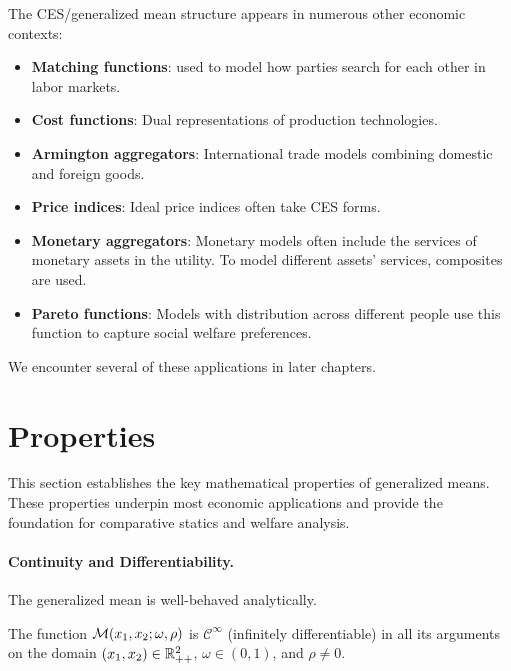 The CES/generalized mean structure appears in numerous other economic contexts:
\begin{itemize}[leftmargin=0em]
    \item \textbf{Matching functions}: used to model how parties search for each other in labor markets.
    \item \textbf{Cost functions}: Dual representations of production technologies.
    \item \textbf{Armington aggregators}: International trade models combining domestic and foreign goods.
    \item \textbf{Price indices}: Ideal price indices often take CES forms.
    \item \textbf{Monetary aggregators}: Monetary models often include the services of monetary assets in the utility. To model different assets' services, composites are used.
    \item \textbf{Pareto functions}: Models with distribution across different people use this function to capture social welfare preferences.
\end{itemize}
We encounter several of these applications in later chapters.


\section{Properties}
\label{sec:properties}

This section establishes the key mathematical properties of generalized means. These properties underpin most economic applications and provide the foundation for comparative statics and welfare analysis.

\paragraph{Continuity and Differentiability.}

The generalized mean is well-behaved analytically.

\begin{proposition}[Smoothness]
\label{prop:smoothness}
The function $\mathcal{M}(x_1, x_2; \omega, \rho)$ is $\mathcal{C}^\infty$ (infinitely differentiable) in all its arguments on the domain $(x_1, x_2) \in \mathbb{R}_{++}^2$, $\omega \in (0,1)$, and $\rho \neq 0$.
\end{proposition}

